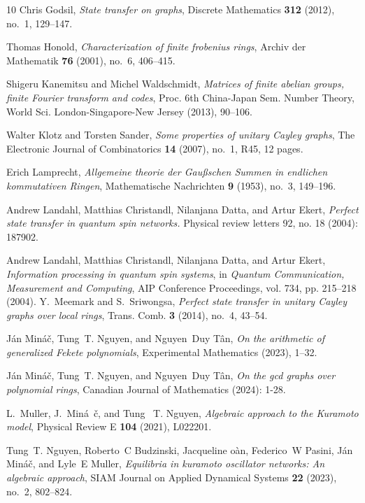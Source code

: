 \documentclass[12pt, a4paper]{amsart}
\theoremstyle{definition}
\numberwithin{equation}{section}
\begin{document}
\begin{thebibliography}{10}
Chris Godsil, \emph{State transfer on graphs}, Discrete Mathematics \textbf{312} (2012), no.~1, 129--147.

Thomas Honold, \emph{Characterization of finite frobenius rings}, Archiv der Mathematik \textbf{76} (2001), no.~6, 406--415.

Shigeru Kanemitsu and Michel Waldschmidt, \emph{Matrices of finite abelian groups, finite {Fourier} transform and codes}, Proc. 6th China-Japan Sem. Number Theory, World Sci. London-Singapore-New Jersey (2013), 90--106.

Walter Klotz and Torsten Sander, \emph{Some properties of unitary {Cayley} graphs}, The Electronic Journal of Combinatorics \textbf{14} (2007), no.~1, R45, 12 pages.


Erich Lamprecht, \emph{Allgemeine theorie der {Gau{\ss}schen} {Summen} in endlichen kommutativen {Ringen}}, Mathematische Nachrichten \textbf{9} (1953), no.~3, 149--196.

Andrew Landahl, Matthias Christandl, Nilanjana Datta, and Artur Ekert, \emph{Perfect state transfer in quantum spin networks.} Physical review letters 92, no. 18 (2004): 187902.

Andrew Landahl, Matthias Christandl, Nilanjana Datta, and Artur Ekert, \emph{Information processing in quantum spin systems}, in \emph{Quantum Communication, Measurement and Computing}, AIP Conference Proceedings, vol. 734, pp. 215--218 (2004).
Y.~Meemark and S.~Sriwongsa, \emph{Perfect state transfer in unitary {C}ayley graphs over local rings}, Trans. Comb. \textbf{3} (2014), no.~4, 43--54. 

J{\'a}n Min{\'a}{\v{c}}, Tung~T. Nguyen, and Nguyen~Duy T{\^a}n, \emph{On the arithmetic of generalized {Fekete} polynomials}, Experimental Mathematics (2023), 1--32.

J{\'a}n Min{\'a}{\v{c}}, Tung~T. Nguyen, and Nguyen~Duy T{\^a}n, \emph{On the gcd graphs over polynomial rings}, Canadian Journal of Mathematics (2024): 1-28. 

L.~Muller, J.~Min\'a\ifmmode~\else \v{c}\fi{}, and Tung ~T. Nguyen, \emph{Algebraic approach to the {Kuramoto} model}, Physical Review E \textbf{104} (2021), L022201.

Tung~T. Nguyen, Roberto~C Budzinski, Jacqueline {\DH}o{\`a}n, Federico~W Pasini, J{\'a}n Min{\'a}{\v{c}}, and Lyle~E Muller, \emph{Equilibria in kuramoto oscillator networks: An algebraic approach}, SIAM Journal on Applied Dynamical Systems \textbf{22} (2023), no.~2, 802--824.


\end{thebibliography}
\end{document}
